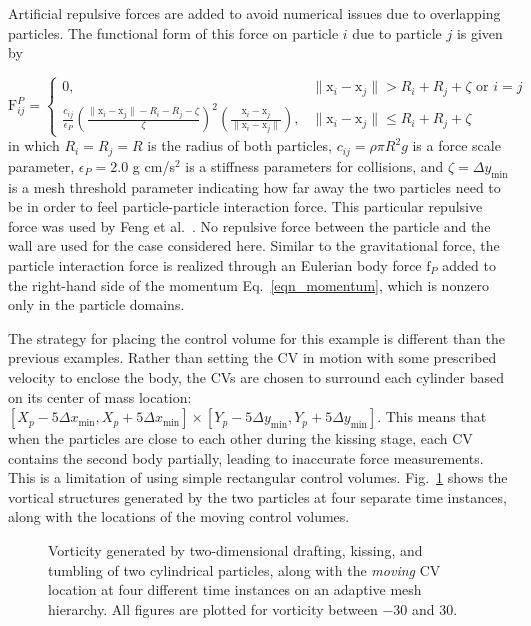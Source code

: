 \documentclass[review]{elsarticle}
\renewcommand{\vec}[1]{\bm{\mathrm{#1}}}
\def \x{\vec{x}}
\def \F{\vec{F}}
\def \F{\vec{F}}
\def \f{\vec{f}}
\def \x{\vec{x}}
\def \dx{\Delta x}
\def \dy{\Delta y}
\def \dx{\Delta x}
\newcommand{\REVIEW}[1]{{#1}}
\begin{document}
{Artificial repulsive forces are added to avoid numerical issues due to overlapping particles. The functional form
of this force on particle $i$ due to particle $j$ is given by

\begin{equation}
\label{eq_repulsive_force}
\F_{ij}^P = 
\begin{cases} 
      0,  & \|\x_i - \x_j \| > R_i + R_j + \zeta \textrm{ or } i = j\\
      \frac{c_{ij}}{\epsilon_P} \left(\frac{\|\x_i - \x_j \| - R_i - R_j - \zeta}{\zeta}\right)^2 
      \left(\frac{\x_i - \x_j}{\|\x_i - \x_j \| }\right),  & \|\x_i - \x_j \| \le R_i + R_j + \zeta
\end{cases}
\end{equation}
in which $R_i = R_j = R$ is the radius of both particles, $c_{ij} = \rho \pi R^2 g$ is a force scale parameter,
$\epsilon_P = 2.0$ g cm/s$^2$ is a stiffness parameters for collisions, and $\zeta = \dy_\textrm{min}$ is a
mesh threshold parameter indicating how far away the two particles need to be in order to feel particle-particle
interaction force. This particular repulsive force was used by Feng et al.~\cite{Feng04}. No repulsive force
between the particle and the wall are used for the case considered here. Similar to the gravitational force,
the particle interaction force is realized through an Eulerian body force $\f_P$ added to the right-hand side of
the momentum Eq.~\eqref{eqn_momentum}, which is nonzero only in the particle domains.

The strategy for placing the control volume for this example is different than the previous examples.
Rather than setting the CV in motion with some prescribed velocity to enclose the body, the CVs are 
chosen to surround each cylinder based on its center of mass  location: 
$[X_p - 5 \dx_\textrm{min}, X_p + 5 \dx_\textrm{min}] \times [Y_p - 5 \dy_\textrm{min}, Y_p +5 \dy_\textrm{min}]$. 
This means that when the particles are close to each other during the kissing stage, 
each CV contains the second body partially, leading to inaccurate force measurements.
This is a limitation of using simple rectangular control volumes. Fig.~\ref{fig_dkt_viz} shows 
the vortical structures generated by the two particles at four separate time instances, 
along with the locations of the moving control volumes.

\begin{figure}[H]
  \centering
  \caption{\REVIEW{
  Vorticity generated by two-dimensional drafting, kissing, and tumbling of two cylindrical particles,
  along with the \emph{moving} CV location at four different time instances on an adaptive mesh hierarchy. 
  All figures are plotted for vorticity between $-30$ and $30$.}
   }
  \label{fig_dkt_viz}
\end{figure}

}
\end{document}

